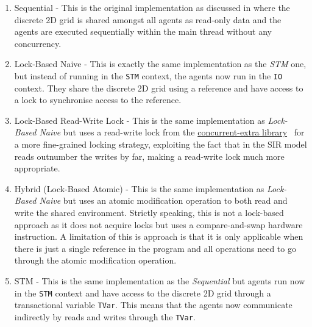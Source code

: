 \begin{enumerate}
	\item Sequential - This is the original implementation as discussed in \cite{thaler_pure_2018} where the discrete 2D grid is shared amongst all agents as read-only data and the agents are executed sequentially within the main thread without any concurrency.
	
	\item Lock-Based Naive - This is exactly the same implementation as the \textit{STM} one, but instead of running in the \texttt{STM} context, the agents now run in the \texttt{IO} context. They share the discrete 2D grid using a reference and have access to a lock to synchronise access to the reference.

	\item Lock-Based Read-Write Lock - This is the same implementation as \textit{Lock-Based Naive} but uses a read-write lock from the \href{http://hackage.haskell.org/package/concurrent-extra}{concurrent-extra library}~\cite{concurrent_extra_library} for a more fine-grained locking strategy, exploiting the fact that in the SIR model reads outnumber the writes by far, making a read-write lock much more appropriate.

	
	\item Hybrid (Lock-Based Atomic) - This is the same implementation as \textit{Lock-Based Naive} but uses an atomic modification operation to both read and write the shared environment. Strictly speaking, this is not a lock-based approach as it does not acquire locks but uses a compare-and-swap hardware instruction. A limitation of this is approach is that it is only applicable when there is just a single reference in the program and all operations need to go through the atomic modification operation.

	\item STM - This is the same implementation as the \textit{Sequential} but agents run now in the \texttt{STM} context and have access to the discrete 2D grid through a transactional variable \texttt{TVar}. This means that the agents now communicate indirectly by reads and writes through the \texttt{TVar}.
	
\end{enumerate}

